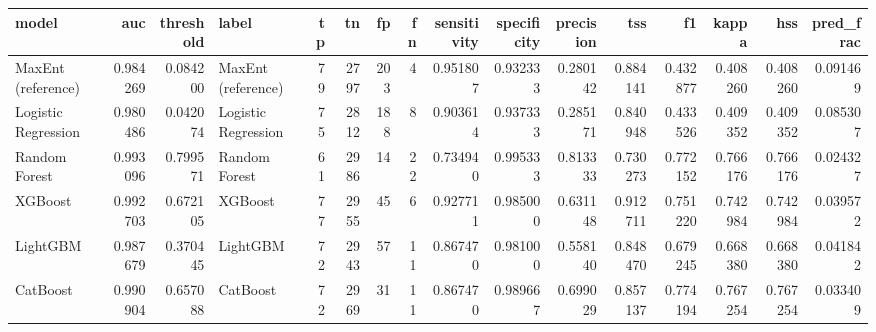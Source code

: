 \begin{tabular}{lrrlrrrrrrrrrrrr}
\toprule
model & auc & threshold & label & tp & tn & fp & fn & sensitivity & specificity & precision & tss & f1 & kappa & hss & pred\_frac \\
\midrule
MaxEnt (reference) & 0.984269 & 0.084200 & MaxEnt (reference) & 79 & 2797 & 203 & 4 & 0.951807 & 0.932333 & 0.280142 & 0.884141 & 0.432877 & 0.408260 & 0.408260 & 0.091469 \\
Logistic Regression & 0.980486 & 0.042074 & Logistic Regression & 75 & 2812 & 188 & 8 & 0.903614 & 0.937333 & 0.285171 & 0.840948 & 0.433526 & 0.409352 & 0.409352 & 0.085307 \\
Random Forest & 0.993096 & 0.799571 & Random Forest & 61 & 2986 & 14 & 22 & 0.734940 & 0.995333 & 0.813333 & 0.730273 & 0.772152 & 0.766176 & 0.766176 & 0.024327 \\
XGBoost & 0.992703 & 0.672105 & XGBoost & 77 & 2955 & 45 & 6 & 0.927711 & 0.985000 & 0.631148 & 0.912711 & 0.751220 & 0.742984 & 0.742984 & 0.039572 \\
LightGBM & 0.987679 & 0.370445 & LightGBM & 72 & 2943 & 57 & 11 & 0.867470 & 0.981000 & 0.558140 & 0.848470 & 0.679245 & 0.668380 & 0.668380 & 0.041842 \\
CatBoost & 0.990904 & 0.657088 & CatBoost & 72 & 2969 & 31 & 11 & 0.867470 & 0.989667 & 0.699029 & 0.857137 & 0.774194 & 0.767254 & 0.767254 & 0.033409 \\
\bottomrule
\end{tabular}
